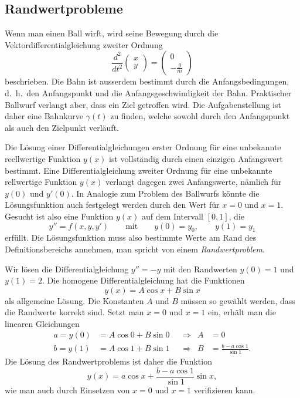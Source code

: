 \subsection{Randwertprobleme\label{section:randwertprobleme}}
Wenn man einen Ball wirft, wird seine Bewegung durch die
%
%
Vektordifferentialgleichung zweiter Ordnung
\[
\frac{d^2}{dt^2}\begin{pmatrix}x\\y\end{pmatrix}
=
\begin{pmatrix}0\\\displaystyle-\frac{g}{m}\end{pmatrix}
\]
beschrieben.
Die Bahn ist ausserdem bestimmt durch die Anfangsbedingungen,
d.~h.~den Anfangspunkt und die Anfangsgeschwindigkeit der Bahn.
%
%
Praktischer Ballwurf verlangt aber, dass ein Ziel getroffen wird.
%
%
Die Aufgabenstellung ist daher eine Bahnkurve $\gamma(t)$ zu finden,
welche sowohl durch den Anfangspunkt als auch den Zielpunkt
verläuft.

Die Lösung einer Differentialgleichungen erster Ordnung für eine
unbekannte reellwertige Funktion $y(x)$ ist vollständig durch einen
einzigen Anfangswert bestimmt.
Eine Differentialgleichung zweiter Ordnung für eine unbekannte
rellwertige Funktion $y(x)$ verlangt dagegen zwei Anfangswerte,
nämlich für $y(0)$ und $y'(0)$.
In Analogie zum Problem des Ballwurfs könnte die Lösungsfunktion auch
festgelegt werden durch den Wert für $x=0$ und $x=1$.
Gesucht ist also eine Funktion $y(x)$ auf dem Intervall $[0,1]$, die
\begin{equation}
y''=f(x,y,y')
\qquad\text{mit}\qquad
y(0)=y_0,
\qquad
y(1)=y_1
\end{equation}
erfüllt.
Die Lösungsfunktion muss also bestimmte Werte am Rand des Definitionsbereichs
annehmen, man spricht von einem {\em Randwertproblem}.
%

\begin{beispiel}
Wir lösen die Differentialgleichung $y''=-y$ mit den Randwerten
$y(0)=1$ und $y(1)=2$.
Die homogene Differentialgleichung hat die Funktionen
\[
y(x)=A \cos x + B\sin x
\]
als allgemeine Lösung.
Die Konstanten $A$ und $B$ müssen so gewählt werden, dass die Randwerte
korrekt sind.
Setzt man $x=0$ und $x=1$ ein, erhält man die linearen Gleichungen
%
\begin{align*}
a=y(0)&=A\cos 0 + B\sin 0
&&\Rightarrow&A&=0\\
b=y(1)&=A\cos 1 + B\sin 1
&&\Rightarrow&
B&=
\frac{b-a\cos 1}{\sin 1}.
\end{align*}
Die Lösung des Randwertproblems ist daher die Funktion
%
\[
y(x)=a\cos x +\frac{b-a\cos 1}{\sin 1}\sin x,
\]
wie man auch durch Einsetzen von $x=0$ und $x=1$ verifizieren kann.
\end{beispiel}

